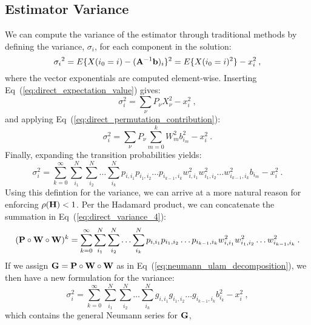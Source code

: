\subsection{Estimator Variance}
\label{subsec:estimator_variance}
We can compute the variance of the estimator through traditional
methods by defining the variance, $\sigma_i$, for each component in
the solution:
\begin{equation}
  {\sigma_i}^2 = E\{X(i_0 = i) - (\mathbf{A}^{-1}\mathbf{b})_i\}^2 = E\{X(i_0
  = i)^2\} - x_i^2\:,
  \label{eq:direct_variance_1}
\end{equation}
where the vector exponentials are computed element-wise. Inserting
Eq~(\ref{eq:direct_expectation_value}) gives:
\begin{equation}
  \sigma_i^2 = \sum_{\nu} P_{\nu} X_{\nu}^2 - x_i^2\:,
  \label{eq:direct_variance_2}
\end{equation}
and applying Eq~(\ref{eq:direct_permutation_contribution}):
\begin{equation}
  \sigma_i^2 = \sum_{\nu} P_{\nu} \sum_{m=0}^k W_{m}^2 b_{i_m}^2 -
  x_i^2\:.
  \label{eq:direct_variance_3}
\end{equation}
Finally, expanding the transition probabilities yields:
\begin{equation}
  \sigma_i^2 = \sum_{k=0}^{\infty}\sum_{i_1}^{N}\sum_{i_2}^{N}\ldots
  \sum_{i_k}^{N} p_{i,i_1}p_{i_1,i_2}\ldots p_{i_{k-1},i_k}
  w^2_{i,i_1}w^2_{i_1,i_2}\ldots w^2_{i_{k-1},i_k} b_{i_m} - x_i^2\:.
  \label{eq:direct_variance_4}
\end{equation}
Using this defintion for the variance, we can arrive at a more natural
reason for enforcing $\rho(\mathbf{H}) < 1$. Per the Hadamard product, we can
concatenate the summation in Eq~(\ref{eq:direct_variance_4}):
\begin{equation}
  (\mathbf{P} \circ \mathbf{W} \circ \mathbf{W})^k =
  \sum_{k=0}^{\infty}\sum_{i_1}^{N}\sum_{i_2}^{N}\ldots \sum_{i_k}^{N}
  p_{i,i_1}p_{i_1,i_2}\ldots p_{i_{k-1},i_k}
  w^2_{i,i_1}w^2_{i_1,i_2}\ldots w^2_{i_{k-1},i_k}\:.
  \label{eq:double_weighted_decomposition}
\end{equation}
If we assign $\mathbf{G} = \mathbf{P} \circ \mathbf{W} \circ \mathbf{W}$ as in
Eq~(\ref{eq:neumann_ulam_decomposition}), we then have a new
formulation for the variance:
\begin{equation}
  \sigma^2_i = \sum_{k=0}^{\infty}\sum_{i_1}^{N}\sum_{i_2}^{N}\ldots
  \sum_{i_k}^{N}g_{i,i_1}g_{i_1,i_2}\ldots g_{i_{k-1},i_k} b_{i_k}^2 -
  x_i^2\:,
\end{equation}
which contains the general Neumann series for $\mathbf{G}$,

